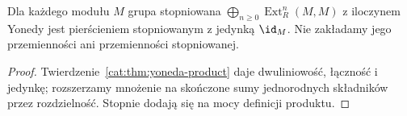 \begin{wniosek}
Dla każdego modułu $M$ grupa stopniowana $\bigoplus_{n\ge0}\operatorname{Ext}_R^n(M,M)$ z iloczynem Yonedy jest pierścieniem stopniowanym z jedynką $\id_M$. Nie zakładamy jego przemienności ani przemienności stopniowanej.
\end{wniosek}
\begin{proof}
Twierdzenie~\ref{cat:thm:yoneda-product} daje dwuliniowość, łączność i jedynkę; rozszerzamy mnożenie na skończone sumy jednorodnych składników przez rozdzielność. Stopnie dodają się na mocy definicji produktu.
\end{proof}
